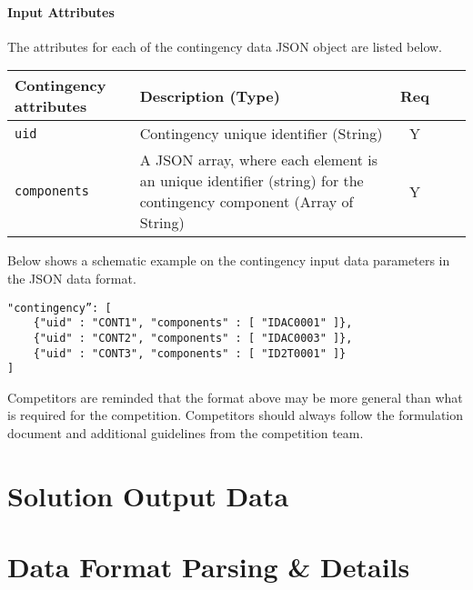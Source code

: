 \documentclass{article}
\begin{document}
\paragraph{Input Attributes}
The attributes for each of the contingency data JSON object
are listed below.

\begin{center}
\small
\begin{tabular}{ l | p{3.5in} | c | c | c }
Contingency attributes & Description (Type) & Req \\
\hline
  {\tt uid} & Contingency unique identifier (String) & Y \\
  {\tt components} & A JSON array, where each element is an unique identifier (string) for the contingency component (Array of String)& Y \\
  \hline
\end{tabular}
\end{center}
Below shows a schematic example on the contingency input data parameters in the JSON data format.
\begin{verbatim}
"contingency”: [
    {"uid" : "CONT1", "components" : [ "IDAC0001" ]},
    {"uid" : "CONT2", "components" : [ "IDAC0003" ]},
    {"uid" : "CONT3", "components" : [ "ID2T0001" ]}
]
\end{verbatim}
Competitors are reminded that the format above may be more general than
what is required for the competition.
Competitors should always
follow the formulation document and additional guidelines from the competition team.





\section{Solution Output Data}


\section{Data Format Parsing \& Details}

\end{document}
